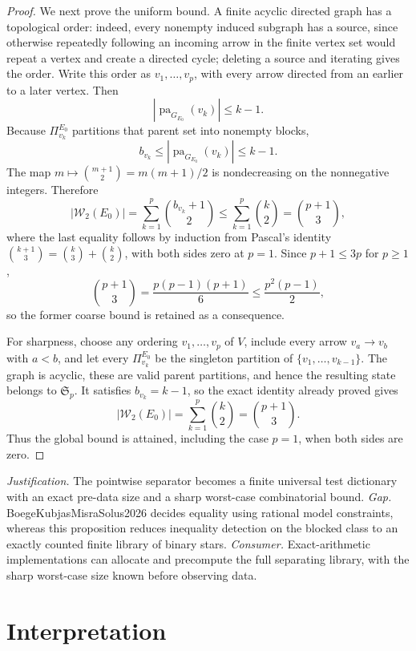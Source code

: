 \documentclass{article}
\begin{document}
\begin{proof}
We next prove the uniform bound.  A finite acyclic directed graph has a topological order: indeed, every nonempty induced subgraph has a source, since otherwise repeatedly following an incoming arrow in the finite vertex set would repeat a vertex and create a directed cycle; deleting a source and iterating gives the order.  Write this order as \(v_1,\ldots,v_p\), with every arrow directed from an earlier to a later vertex.  Then
\[
|\operatorname{pa}_{G_{E_0}}(v_k)|\leq k-1.
\]
Because \(\Pi^{E_0}_{v_k}\) partitions that parent set into nonempty blocks,
\[
b_{v_k}\leq|\operatorname{pa}_{G_{E_0}}(v_k)|\leq k-1.
\]
The map \(m\mapsto\binom{m+1}{2}=m(m+1)/2\) is nondecreasing on the nonnegative integers.  Therefore
\[
|\mathcal W_2(E_0)|
=\sum_{k=1}^{p}\binom{b_{v_k}+1}{2}
\leq\sum_{k=1}^{p}\binom{k}{2}
=\binom{p+1}{3},
\]
where the last equality follows by induction from Pascal's identity \(\binom{k+1}{3}=\binom{k}{3}+\binom{k}{2}\), with both sides zero at \(p=1\).  Since \(p+1\leq3p\) for \(p\geq1\),
\[
\binom{p+1}{3}
=\frac{p(p-1)(p+1)}{6}
\leq\frac{p^2(p-1)}{2},
\]
so the former coarse bound is retained as a consequence.

For sharpness, choose any ordering \(v_1,\ldots,v_p\) of \(V\), include every arrow \(v_a\to v_b\) with \(a<b\), and let every \(\Pi^{E_0}_{v_k}\) be the singleton partition of \(\{v_1,\ldots,v_{k-1}\}\).  The graph is acyclic, these are valid parent partitions, and hence the resulting state belongs to \(\mathfrak S_p\).  It satisfies \(b_{v_k}=k-1\), so the exact identity already proved gives
\[
|\mathcal W_2(E_0)|
=\sum_{k=1}^{p}\binom{k}{2}
=\binom{p+1}{3}.
\]
Thus the global bound is attained, including the case \(p=1\), when both sides are zero.
\end{proof}
\par\smallskip\noindent \textit{Justification.} The pointwise separator becomes a finite universal test dictionary with an exact pre-data size and a sharp worst-case combinatorial bound. \textit{Gap.} BoegeKubjasMisraSolus2026 decides equality using rational model constraints, whereas this proposition reduces inequality detection on the blocked class to an exactly counted finite library of binary stars. \textit{Consumer.} Exact-arithmetic implementations can allocate and precompute the full separating library, with the sharp worst-case size known before observing data.

\section{Interpretation}
\end{document}
